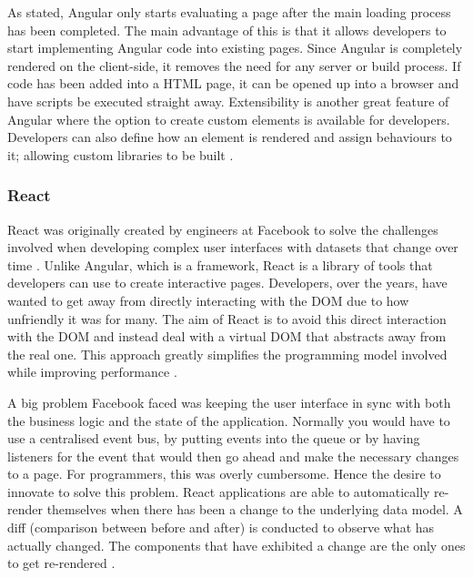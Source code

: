 As stated, Angular only starts evaluating a page after the main loading process has been completed.
The main advantage of this is that it allows developers to start implementing Angular code into existing pages.
Since Angular is completely rendered on the client-side, it removes the need for any server or build process. 
If code has been added into a HTML page, it can be opened up into a browser and have scripts be executed straight away.
Extensibility is another great feature of Angular where the option to create custom elements is available for developers.
Developers can also define how an element is rendered and assign behaviours to it; allowing custom libraries to be built \cite{jain2015angularjs}.

\subsubsection*{React} 
React was originally created by engineers at Facebook to solve the challenges involved when developing complex user interfaces with datasets 
that change over time \cite{gackenheimer2015introduction}. 
Unlike Angular, which is a framework, React is a library of tools that developers can use to create interactive pages.
Developers, over the years, have wanted to get away from directly interacting with the DOM due to how unfriendly it was for many.
The aim of React is to avoid this direct interaction with the DOM and instead deal with a virtual DOM that abstracts away from
the real one. This approach greatly simplifies the programming model involved while improving performance \cite{staff2016react}.

A big problem Facebook faced was keeping the user interface in sync with both the business logic and the state of the application.
Normally you would have to use a centralised event bus, by putting events into the queue or by having listeners for the event that would then go
ahead and make the necessary changes to a page. 
For programmers, this was overly cumbersome. Hence the desire to innovate to solve this problem.
React applications are able to automatically re-render themselves when there has been a change to the underlying data model.
A diff (comparison between before and after) is conducted to observe what has actually changed. The components that have exhibited a change are the
only ones to get re-rendered \cite{staff2016react}.

